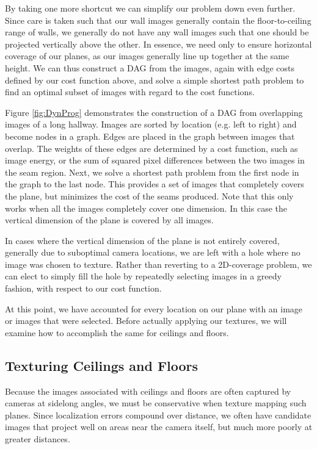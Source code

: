 \documentclass[10pt,twocolumn,letterpaper]{article}
\begin{document}
By taking one more shortcut we can simplify our problem down even further. Since care is taken such that our wall images generally contain the floor-to-ceiling range of walls, we generally do not have any wall images such that one should be projected vertically above the other. In essence, we need only to ensure horizontal coverage of our planes, as our images generally line up together at the same height. We can thus construct a DAG from the images, again with edge costs defined by our cost function above, and solve a simple shortest path problem to find an optimal subset of images with regard to the cost functions.

Figure \ref{fig:DynProg} demonstrates the construction of a DAG from overlapping images of a long hallway. Images are sorted by location (e.g. left to right) and become nodes in a graph. Edges are placed in the graph between images that overlap. The weights of these edges are determined by a cost function, such as image energy, or the sum of squared pixel differences between the two images in the seam region. Next, we solve a shortest path problem from the first node in the graph to the last node. This provides a set of images that completely covers the plane, but minimizes the cost of the seams produced. Note that this only works when all the images completely cover one dimension. In this case the vertical dimension of the plane is covered by all images. 

In cases where the vertical dimension of the plane is not entirely covered, generally due to suboptimal camera locations, we are left with a hole where no image was chosen to texture. Rather than reverting to a 2D-coverage problem, we can elect to simply fill the hole by repeatedly selecting images in a greedy fashion, with respect to our cost function.

At this point, we have accounted for every location on our plane with an image or images that were selected. Before actually applying our textures, we will examine how to accomplish the same for ceilings and floors.

\subsection{Texturing Ceilings and Floors}


Because the images associated with ceilings and floors are often captured by cameras at sidelong angles, we must be conservative when texture mapping such planes. Since localization errors compound over distance, we often have candidate images that project well on areas near the camera itself, but much more poorly at greater distances. 
\end{document}
